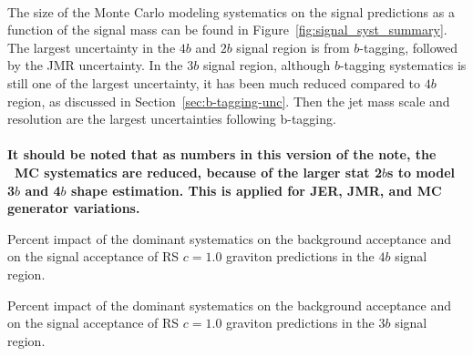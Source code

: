 \paragraph{}
The size of the Monte Carlo modeling systematics on the signal predictions as a function of the signal mass can be found in Figure~\ref{fig:signal_syst_summary}. The largest uncertainty in the $4b$ and $2b$ signal region is from $b$-tagging, followed by the JMR uncertainty. In the $3b$ signal region, although $b$-tagging systematics is still one of the largest uncertainty, it has been much reduced compared to $4b$ region, as discussed in Section~\ref{sec:b-tagging-unc}. Then the jet mass scale and resolution are the largest uncertainties following b-tagging.

\paragraph{}
\textbf{It should be noted that as numbers in this version of the note, the \ttbar\ MC systematics are reduced, because of the larger stat 2$b$s \ttbar to model 3$b$ and 4$b$ \ttbar shape estimation. This is applied for JER, JMR, and \ttbar MC generator variations.}

\begin{table}[htbp!]
\scriptsize
\begin{center}

\caption{Percent impact of the dominant systematics on the  background acceptance
         and on the signal acceptance of RS $c=1.0$ graviton predictions in the $4b$ signal region.}
\label{tab:summary-systematics-4b}
\end{center}
\end{table}


\begin{table}[htbp!]
\scriptsize
\begin{center}

\caption{Percent impact of the dominant systematics on the  background acceptance
         and on the signal acceptance of RS $c=1.0$ graviton predictions in the $3b$ signal region.}
\label{tab:summary-systematics-3b}
\end{center}
\end{table}

